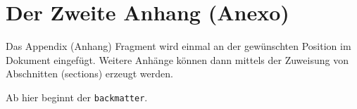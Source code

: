 \chapter{Der Zweite Anhang (Anexo)}

Das Appendix (Anhang) Fragment wird einmal an der gew\"{u}nschten Position
im Dokument eingef\"{u}gt. Weitere Anh\"{a}nge k\"{o}nnen dann mittels der
Zuweisung von Abschnitten (sections) erzeugt werden.

\bigskip

Ab hier beginnt der \verb|backmatter|.

